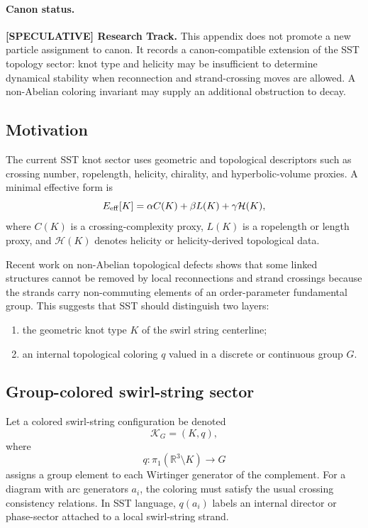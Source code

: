 \paragraph{Canon status.}
\textbf{[SPECULATIVE] Research Track.}
This appendix does not promote a new particle assignment to canon. It records a canon-compatible extension of the SST topology sector: knot type and helicity may be insufficient to determine dynamical stability when reconnection and strand-crossing moves are allowed. A non-Abelian coloring invariant may supply an additional obstruction to decay.

\subsection{Motivation}
The current SST knot sector uses geometric and topological descriptors such as crossing number, ropelength, helicity, chirality, and hyperbolic-volume proxies. A minimal effective form is
\begin{equation}
    E_{\rm eff}[K]
    = \alpha C(K)+\beta L(K)+\gamma \mathcal H(K),
    \label{eq:sst_eff_energy_old}
\end{equation}
where $C(K)$ is a crossing-complexity proxy, $L(K)$ is a ropelength or length proxy, and $\mathcal H(K)$ denotes helicity or helicity-derived topological data.

Recent work on non-Abelian topological defects shows that some linked structures cannot be removed by local reconnections and strand crossings because the strands carry non-commuting elements of an order-parameter fundamental group. This suggests that SST should distinguish two layers:
\begin{enumerate}
    \item the geometric knot type $K$ of the swirl string centerline;
    \item an internal topological coloring $q$ valued in a discrete or continuous group $G$.
\end{enumerate}

\subsection{Group-colored swirl-string sector}
Let a colored swirl-string configuration be denoted
\begin{equation}
    \mathcal K_G=(K,q),
\end{equation}
where
\begin{equation}
    q: \pi_1\!\left(\mathbb R^3\setminus K\right)\longrightarrow G
    \label{eq:coloring_homomorphism}
\end{equation}
assigns a group element to each Wirtinger generator of the complement. For a diagram with arc generators $a_i$, the coloring must satisfy the usual crossing consistency relations. In SST language, $q(a_i)$ labels an internal director or phase-sector attached to a local swirl-string strand.


